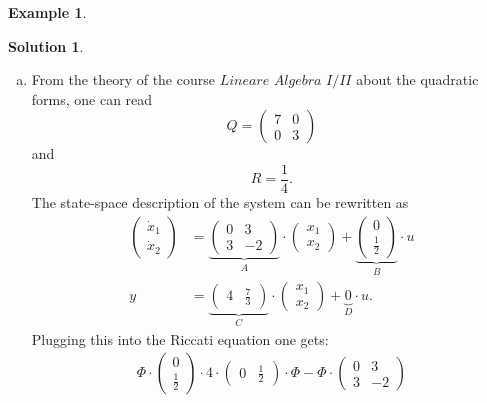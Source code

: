 \documentclass[a4paper,12 pt]{article}
\numberwithin{equation}{section}
\theoremstyle{definition}
\newtheorem{bsp}{Example}
\theoremstyle{remark}
\theoremstyle{definition}
\newtheorem*{lsg}{Solution}
\theoremstyle{definition}
\theoremstyle{definition}
\theoremstyle{remark}
\begin{document}
\begin{bsp}
\newpage
\begin{lsg}
\
\begin{enumerate}[(a)]
\item 
From the theory of the course $\textit{Lineare Algebra I/II}$ about the quadratic forms, one can read
\begin{equation*}
Q=\begin{pmatrix}
7&0\\ 0&3
\end{pmatrix}
\end{equation*}
and
\begin{equation*}
R=\frac{1}{4}.
\end{equation*}
The state-space description of the system can be rewritten as
\begin{equation*}
\begin{split}
\begin{pmatrix} 
\dot{x}_1\\ \dot{x}_2
\end{pmatrix}&=\underbrace{\begin{pmatrix} 0&3 \\ 3&-2 
\end{pmatrix}}_{A}\cdot \begin{pmatrix} x_1\\ x_2 
 \end{pmatrix}+ \underbrace{\begin{pmatrix} 0\\  \frac{1}{2} 
 \end{pmatrix}}_{B}\cdot u\\
 y&=\underbrace{\begin{pmatrix} 4&\frac{7}{3}
\end{pmatrix}}_{C}\cdot \begin{pmatrix} x_1\\ x_2 
 \end{pmatrix}+\underbrace{0}_{D}\cdot u.
\end{split}
\end{equation*}
Plugging this into the Riccati equation one gets:
\begin{equation*}
\begin{split}
\Phi \cdot \begin{pmatrix} 0\\  \frac{1}{2} 
 \end{pmatrix}\cdot 4 \cdot \begin{pmatrix} 0&  \frac{1}{2} 
 \end{pmatrix}\cdot \Phi-\Phi \cdot \begin{pmatrix} 0&3 \\ 3&-2 

\end{pmatrix}
\end{split}
\end{equation*}
\end{enumerate}
\end{lsg}
\end{bsp}
\end{document}
